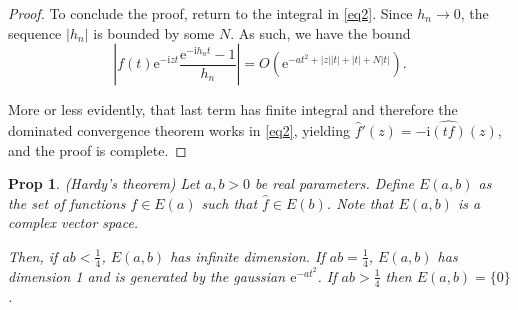 \documentclass{amsart}
\newcommand{\e}{\mathrm{e}}
\newcommand{\I}{\mathrm{i}}
\newtheorem{prop}{Prop}
\begin{document}
\begin{proof}
To conclude the proof, return to the integral in \eqref{eq2}. Since $h_n \to 0$, the sequence $\lvert h_n \rvert$ is bounded by some $N$. As such, we have the bound
\[\left\lvert f(t) \e^{- \I z t} \frac{\e^{-\I h_n t} - 1}{h_n} \right\rvert = O(\e^{-a t^2 + \lvert z \rvert  \lvert t \rvert + \lvert t \rvert + N \lvert t \rvert}).\]

More or less evidently, that last term has finite integral and therefore the dominated convergence theorem works in \eqref{eq2}, yielding $\hat f'(z) = -\I \widehat{(t f)}(z)$, and the proof is complete.
\end{proof}

\begin{prop} (Hardy's theorem)
Let $a, b > 0$ be real parameters. Define $E(a,b)$ as the set of functions $f \in E(a)$ such that $\hat f \in E(b)$. Note that $E(a,b)$ is a complex vector space.

Then, if $ab < \frac14$, $E(a,b)$ has infinite dimension. If $ab = \frac14$, $E(a,b)$ has dimension 1 and is generated by the gaussian $\e^{-a t^2}$. If $ab > \frac14$ then $E(a,b) = \{0\}$.
\end{prop}
\end{document}
